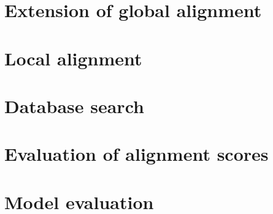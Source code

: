 \documentclass[12pt]{article}
\begin{document}
\section{Extension of global alignment}







\newpage

%
%
\setcounter{figure}{0}
\setcounter{table}{0}
\section{Local alignment}




\newpage

%
%
\setcounter{figure}{0}
\setcounter{table}{0}
\section{Database search}







\newpage
%
%
\setcounter{figure}{0}
\setcounter{table}{0}
\section{Evaluation of alignment scores}






%
%
\setcounter{figure}{0}
\setcounter{table}{0}
\section{Model evaluation}


\newpage


\end{document}
